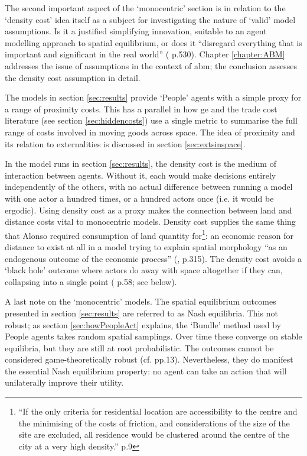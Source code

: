 The second important aspect of the `monocentric' section is in relation to the `density cost' idea itself as a subject for investigating the nature of `valid' model assumptions. Is it a justified simplifying innovation, suitable to an agent modelling approach to spatial equilibrium, or does it ``disregard everything that is important and significant in the real world'' (\citealt{hayek_use_1945} p.530). Chapter \ref{chapter:ABM} addresses the issue of assumptions in the context of \gls{abm}; the conclusion assesses the density cost assumption in detail.

The models in section \ref{sec:results} provide `People' agents with a simple proxy for a range of proximity costs. This has a parallel in how \gls{ge} and the trade cost literature (see section \ref{sec:hiddencosts}) use a single metric to summarise the full range of costs involved in moving goods across space. The idea of proximity and its relation to externalities is discussed in section \ref{sec:extsinspace}. 

In the model runs in section \ref{sec:results}, the density cost is the medium of interaction between agents. Without it, each would make decisions entirely independently of the others, with no actual difference between running a model with one actor a hundred times, or a hundred actors once (i.e. it would be ergodic). Using density cost as a proxy makes the connection between land and distance costs vital to monocentric models. Density cost supplies the same thing that Alonso required consumption of land quantity for\footnote{``If the only criteria for residential location are accessibility to the centre and the minimising of the costs of friction, and considerations of the size of the site are excluded, all residence would be clustered around the centre of the city at a very high density.'' \citealt{alonso_location_1964} p.9}: an economic reason for distance to exist at all in a model trying to explain spatial morphology ``as an endogenous outcome of the economic process'' (\citealt{storper_agglomeration_2010}, p.315). The density cost avoids a `black hole' outcome where actors do away with space altogether if they can, collapsing into a single point (\citealt{fujita_location_1999} p.58; see below).

A last note on the `monocentric' models. The spatial equilibrium outcomes presented in section \ref{sec:results} are referred to as Nash equilibria. This not robust; as section \ref{sec:howPeopleAct} explains, the `Bundle' method used by People agents takes random spatial samplings. Over time these converge on stable equilibria, but they are still at root probabilistic. The outcomes cannot be considered game-theoretically robust (cf. \citealt{vives_oligopoly_2001} pp.13). Nevertheless, they do manifest the essential Nash equilibrium property: no agent can take an action that will unilaterally improve their utility.

